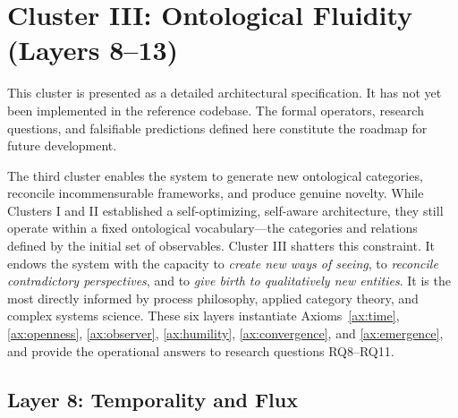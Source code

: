 \section{Cluster III: Ontological Fluidity (Layers 8--13)}
\label{sec:cluster3}

\begin{tcolorbox}[colback=gray!10, colframe=gray!50, title=Status: Architectural Specification]
This cluster is presented as a detailed architectural specification. It has not yet been implemented in the reference codebase. The formal operators, research questions, and falsifiable predictions defined here constitute the roadmap for future development.
\end{tcolorbox}

The third cluster enables the system to generate new ontological categories, reconcile incommensurable frameworks, and produce genuine novelty. While Clusters I and II established a self-optimizing, self-aware architecture, they still operate within a fixed ontological vocabulary—the categories and relations defined by the initial set of observables. Cluster III shatters this constraint. It endows the system with the capacity to \emph{create new ways of seeing}, to \emph{reconcile contradictory perspectives}, and to \emph{give birth to qualitatively new entities}. It is the most directly informed by process philosophy, applied category theory, and complex systems science. These six layers instantiate Axioms~\ref{ax:time}, \ref{ax:openness}, \ref{ax:observer}, \ref{ax:humility}, \ref{ax:convergence}, and \ref{ax:emergence}, and provide the operational answers to research questions RQ8--RQ11.

\subsection{Layer 8: Temporality and Flux}
\label{subsec:layer8}


